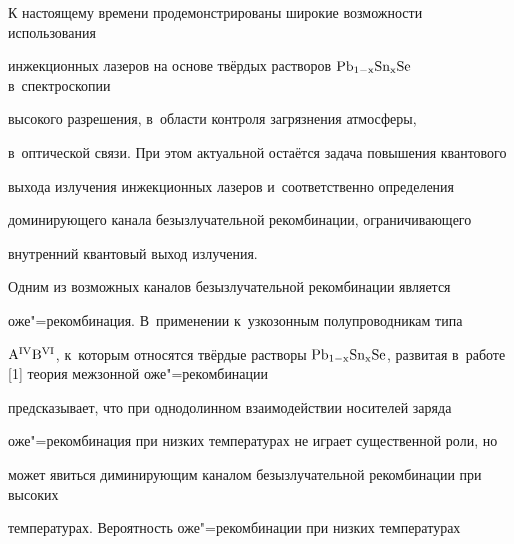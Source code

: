 \date{29.12.2007} 



\address{\samgtu}







\renewcommand{\baselinestretch}{.95}

\maketitle







К настоящему времени продемонстрированы широкие возможности использования 

инжекционных лазеров на основе твёрдых растворов $\rm Pb_{1 - x}Sn_{x}Se$ в~спектроскопии 

высокого разрешения, в~области контроля загрязнения атмосферы, 

в~оптической связи. При этом актуальной остаётся задача повышения квантового 

выхода излучения инжекционных лазеров и~соответственно определения 

доминирующего канала безызлучательной рекомбинации, ограничивающего 

внутренний квантовый выход излучения.







Одним из возможных каналов безызлучательной рекомбинации является 

оже"=рекомбинация. \linebreak В~применении к~узкозонным полупроводникам типа 

$\rm A^{IV}B^{VI}$, к~которым относятся твёрдые растворы $\rm Pb_{1 - 

x}Sn_{x}Se$, развитая в~работе [1] теория межзонной оже"=рекомбинации 

предсказывает, что при однодолинном взаимодействии носителей заряда 

оже"=рекомбинация при низких температурах не играет существенной роли, но 

может явиться диминирующим каналом безызлучательной рекомбинации при высоких 

температурах. Вероятность оже"=рекомбинации при низких температурах 

